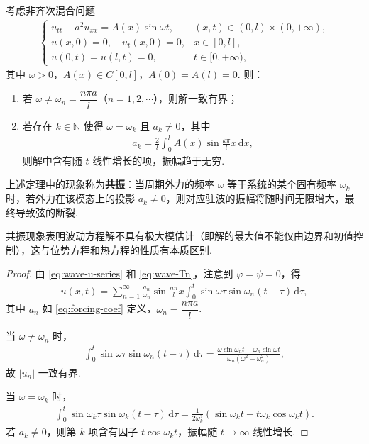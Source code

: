\documentclass[../../main.tex]{subfiles}%
\begin{document}
\begin{theorem}[共振]
考虑非齐次混合问题
\begin{align}
\begin{cases}
u_{tt}-a^2u_{xx}=A(x)\sin\omega t, & (x,t)\in(0,l)\times(0,+\infty), \\
u(x,0)=0,\quad u_t(x,0)=0, & x\in[0,l], \\
u(0,t)=u(l,t)=0, & t\in[0,+\infty),
\end{cases} \label{eq:resonance}
\end{align}
其中 $\omega>0$，$A(x)\in C[0,l]$，$A(0)=A(l)=0$. 则：
\begin{enumerate}[(1)]
\item 若 $\omega\neq \omega_n=\dfrac{n\pi a}{l}$（$n=1,2,\cdots$），则解一致有界；
\item 若存在 $k\in\mathbb{N}$ 使得 $\omega=\omega_k$ 且 $a_k\neq 0$，其中
\begin{align}
a_k=\frac{2}{l}\int_0^l A(x)\sin\frac{k\pi}{l}x\,\mathrm{d}x, \label{eq:forcing-coef}
\end{align}
则解中含有随 $t$ 线性增长的项，振幅趋于无穷.
\end{enumerate}
\end{theorem}
\begin{remark}
上述定理中的现象称为\textbf{共振}：当周期外力的频率 $\omega$ 等于系统的某个固有频率 $\omega_k$ 时，若外力在该模态上的投影 $a_k\neq 0$，则对应驻波的振幅将随时间无限增大，最终导致弦的断裂.
\end{remark}
\begin{remark}
共振现象表明波动方程解不具有极大模估计（即解的最大值不能仅由边界和初值控制），这与位势方程和热方程的性质有本质区别.
\end{remark}
\begin{proof}
由 \eqref{eq:wave-u-series} 和 \eqref{eq:wave-Tn}，注意到 $\varphi=\psi=0$，得
\begin{align*}
u(x,t)=\sum_{n=1}^{\infty}\frac{a_n}{\omega_n}\sin\frac{n\pi}{l}x\int_0^t\sin\omega\tau\sin\omega_n(t-\tau)\,\mathrm{d}\tau,
\end{align*}
其中 $a_n$ 如 \eqref{eq:forcing-coef} 定义，$\omega_n=\dfrac{n\pi a}{l}$.

当 $\omega\neq \omega_n$ 时，
\begin{align*}
\int_0^t\sin\omega\tau\sin\omega_n(t-\tau)\,\mathrm{d}\tau
=\frac{\omega\sin\omega_nt-\omega_n\sin\omega t}{\omega_n(\omega^2-\omega_n^2)},
\end{align*}
故 $|u_n|$ 一致有界.

当 $\omega=\omega_k$ 时，
\begin{align*}
\int_0^t\sin\omega_k\tau\sin\omega_k(t-\tau)\,\mathrm{d}\tau
=\frac{1}{2\omega_k^2}(\sin\omega_kt-t\omega_k\cos\omega_kt).
\end{align*}
若 $a_k\neq 0$，则第 $k$ 项含有因子 $t\cos\omega_kt$，振幅随 $t\to\infty$ 线性增长.
\end{proof}
\end{document}
